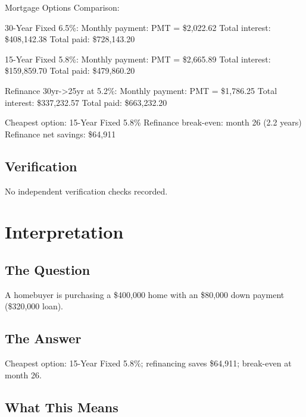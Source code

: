 \documentclass[11pt, a4paper]{article}
\begin{document}
Mortgage Options Comparison:

  30-Year Fixed 6.5\%:
    Monthly payment: PMT = \$2,022.62
    Total interest: \$408,142.38
    Total paid: \$728,143.20

  15-Year Fixed 5.8\%:
    Monthly payment: PMT = \$2,665.89
    Total interest: \$159,859.70
    Total paid: \$479,860.20

  Refinance 30yr->25yr at 5.2\%:
    Monthly payment: PMT = \$1,786.25
    Total interest: \$337,232.57
    Total paid: \$663,232.20

Cheapest option: 15-Year Fixed 5.8\%
Refinance break-even: month 26 (2.2 years)
Refinance net savings: \$64,911

\subsection{Verification}

No independent verification checks recorded.

\section{Interpretation}

\subsection{The Question}
A homebuyer is purchasing a \$400,000 home with an \$80,000 down payment (\$320,000 loan).

\subsection{The Answer}

\begin{polyainsight}[title={Bottom Line}]
Cheapest option: 15-Year Fixed 5.8\%; refinancing saves \$64,911; break-even at month 26.
\end{polyainsight}

\subsection{What This Means}
\end{document}

